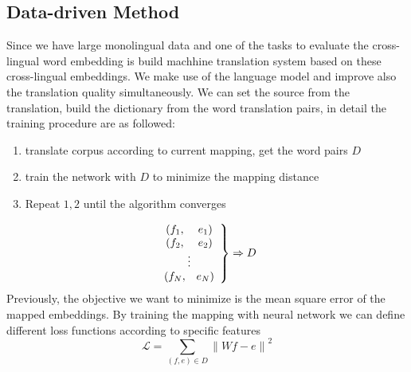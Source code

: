 \subsection{Data-driven Method}
Since we have large monolingual data and one of the tasks to evaluate the cross-lingual word embedding is build machhine translation system based on these cross-lingual embeddings. We make use of the language model and improve also the translation quality simultaneously. We can set the source from the translation, build the dictionary from the word translation pairs, in detail the training procedure are as followed:
\begin{enumerate}
	\item translate corpus according to current mapping, get the word pairs $D$
	\item train the network with $D$ to minimize the mapping distance
	\item Repeat $1,2$ until the algorithm converges
\end{enumerate}
		\[ 
		\left. \begin{array}{c c} 
		(f_1,& e_1)\\
		(f_2,& e_2)\\
		\multicolumn{2}{c}{\vdots}\\
		(f_N,& e_N)
		\end{array} \right\} 
		\Rightarrow D
		\]
Previously, the objective we want to minimize is the mean square error of the mapped embeddings. By training the mapping with neural network we can define different loss functions according to specific features
		\[\mathcal{L} = \sum_{(f,e)\in D} {\lVert Wf - e \rVert}^2  \]


